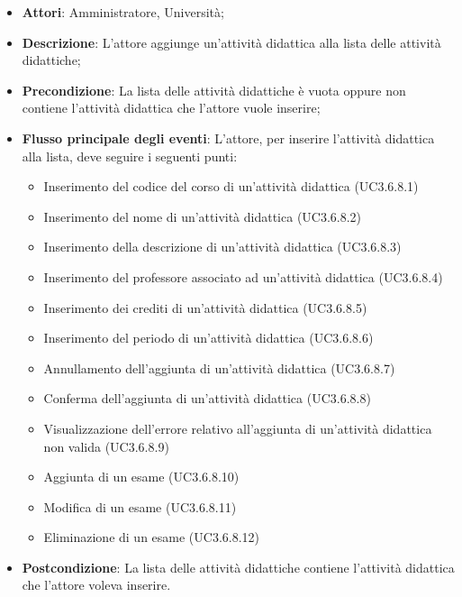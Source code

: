 \begin{itemize}
\item \textbf{Attori}: Amministratore, Università;
\item \textbf{Descrizione}: L'attore aggiunge un'attività didattica alla lista delle attività didattiche;

\item \textbf{Precondizione}: La lista delle attività didattiche è vuota oppure non contiene l'attività didattica che l'attore vuole inserire;

\item \textbf{Flusso principale degli eventi}: L'attore, per inserire l'attività didattica alla lista, deve seguire i seguenti punti:

\begin{itemize}
\item Inserimento del codice del corso di un'attività didattica (UC3.6.8.1)
\item Inserimento del nome di un’attività didattica (UC3.6.8.2)
\item Inserimento della descrizione di un'attività didattica (UC3.6.8.3)
\item Inserimento del professore associato ad un'attività didattica (UC3.6.8.4)
\item Inserimento dei crediti di un’attività didattica (UC3.6.8.5)
\item Inserimento del periodo di un’attività didattica (UC3.6.8.6)
\item Annullamento dell’aggiunta di un’attività didattica (UC3.6.8.7)
\item Conferma dell’aggiunta di un’attività didattica (UC3.6.8.8)
\item Visualizzazione dell'errore relativo all’aggiunta di un’attività didattica non valida (UC3.6.8.9)
\item Aggiunta di un esame (UC3.6.8.10)
\item Modifica di un esame (UC3.6.8.11)
\item Eliminazione di un esame (UC3.6.8.12)
\end{itemize}
\item \textbf{Postcondizione}: La lista delle attività didattiche contiene l'attività didattica che l'attore voleva inserire.

\end{itemize}
